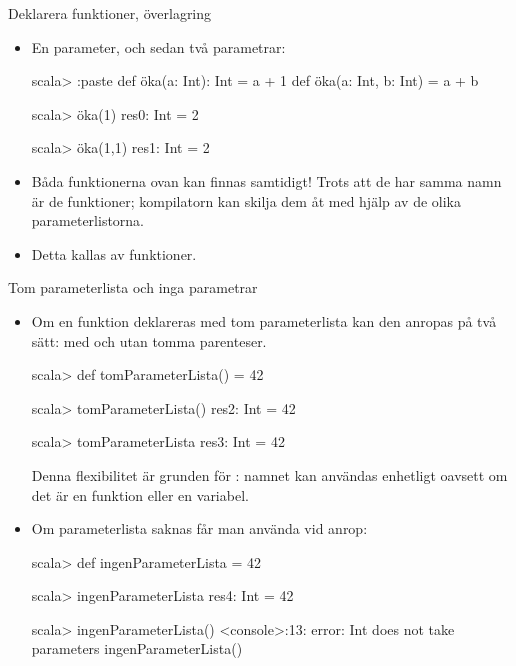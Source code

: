 




\begin{Slide}{Deklarera funktioner, överlagring}
\begin{itemize}
\item En parameter, och sedan två parametrar:
\begin{REPL}
scala> :paste
  def öka(a: Int): Int = a + 1
  def öka(a: Int, b: Int) = a + b
  
scala> öka(1)
res0: Int = 2

scala> öka(1,1)
res1: Int = 2

\end{REPL}
\item Båda funktionerna ovan kan finnas samtidigt! Trots att de har samma namn är de  funktioner; kompilatorn kan skilja dem åt med hjälp av de olika parameterlistorna.

\item Detta kallas   av funktioner.

\end{itemize}
\end{Slide} 


\begin{Slide}{Tom parameterlista och inga parametrar}\SlideFontSmall
\begin{itemize}
\item Om en funktion deklareras med tom parameterlista \code{()} kan den anropas på två sätt: med och utan tomma parenteser.
\begin{REPL}
scala> def tomParameterLista() = 42

scala> tomParameterLista()
res2: Int = 42

scala> tomParameterLista
res3: Int = 42
\end{REPL}

Denna flexibilitet är grunden för : namnet kan användas enhetligt oavsett om det är en funktion eller en variabel.
\item Om parameterlista saknas får man  använda \code{()} vid anrop:

\begin{REPL}
scala> def ingenParameterLista = 42

scala> ingenParameterLista
res4: Int = 42

scala> ingenParameterLista()
<console>:13: error: Int does not take parameters
       ingenParameterLista()
\end{REPL}

\end{itemize}
\end{Slide} 


